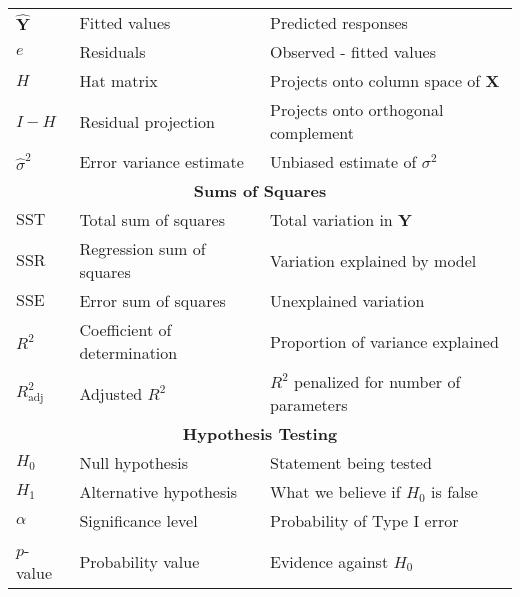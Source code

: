 \documentclass[10pt]{article}
\newcommand{\vect}[1]{\symbf{#1}} %
\begin{document}
\begin{center}
\begin{tabular}{l l l}
    $\hat{\vect{Y}}$           & Fitted values                  & Predicted responses                                     \\
    $e$                        & Residuals                      & Observed - fitted values                                \\
    $H$                        & Hat matrix                     & Projects onto column space of $\vect{X}$                \\
    $I - H$                    & Residual projection            & Projects onto orthogonal complement                     \\
    $\hat{\sigma}^2$           & Error variance estimate        & Unbiased estimate of $\sigma^2$                         \\
    \midrule
    \multicolumn{3}{c}{\textbf{Sums of Squares}}                                                                          \\
    $\text{SST}$               & Total sum of squares           & Total variation in $\vect{Y}$                           \\
    $\text{SSR}$               & Regression sum of squares      & Variation explained by model                            \\
    $\text{SSE}$               & Error sum of squares           & Unexplained variation                                   \\
    $R^2$                      & Coefficient of determination   & Proportion of variance explained                        \\
    $R_{\text{adj}}^2$         & Adjusted $R^2$                 & $R^2$ penalized for number of parameters                \\
    \midrule
    \multicolumn{3}{c}{\textbf{Hypothesis Testing}}                                                                       \\
    $H_0$                      & Null hypothesis                & Statement being tested                                  \\
    $H_1$                      & Alternative hypothesis         & What we believe if $H_0$ is false                       \\
    $\alpha$                   & Significance level             & Probability of Type I error                             \\
    $p$-value                  & Probability value              & Evidence against $H_0$                                  \\

\end{tabular}
\end{center}
\end{document}
